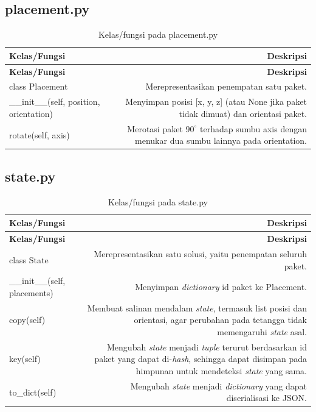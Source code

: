 
\subsection{placement.py}

\begin{longtable}{|K|D|}
\caption{Kelas/fungsi pada placement.py}
\label{tab:placement} \\
\hline
\textbf{Kelas/Fungsi} & \textbf{Deskripsi} \\
\hline
\endfirsthead
\hline
\textbf{Kelas/Fungsi} & \textbf{Deskripsi} \\
\hline
\endhead
\hline
\endlastfoot
class Placement & Merepresentasikan penempatan satu paket. \\ \hline
\_\_init\_\_(self, position, orientation) & Menyimpan posisi [x, y, z] (atau None jika paket tidak dimuat) dan orientasi paket. \\ \hline
rotate(self, axis) & Merotasi paket $90^\circ$ terhadap sumbu axis dengan menukar dua sumbu lainnya pada orientation. \\ \hline
\end{longtable}


\subsection{state.py}

\begin{longtable}{|K|D|}
\caption{Kelas/fungsi pada state.py}
\label{tab:state} \\
\hline
\textbf{Kelas/Fungsi} & \textbf{Deskripsi} \\
\hline
\endfirsthead
\hline
\textbf{Kelas/Fungsi} & \textbf{Deskripsi} \\
\hline
\endhead
\hline
\endlastfoot
class State & Merepresentasikan satu solusi, yaitu penempatan seluruh paket. \\ \hline
\_\_init\_\_(self, placements) & Menyimpan \textit{dictionary} id paket ke Placement. \\ \hline
copy(self) & Membuat salinan mendalam \textit{state}, termasuk list posisi dan orientasi, agar perubahan pada tetangga tidak memengaruhi \textit{state} asal. \\ \hline
key(self) & Mengubah \textit{state} menjadi \textit{tuple} terurut berdasarkan id paket yang dapat di-\textit{hash}, sehingga dapat disimpan pada himpunan untuk mendeteksi \textit{state} yang sama. \\ \hline
to\_dict(self) & Mengubah \textit{state} menjadi \textit{dictionary} yang dapat diserialisasi ke JSON. \\ \hline
\end{longtable}

